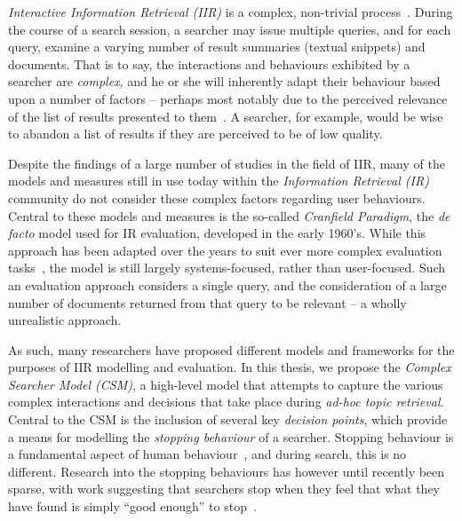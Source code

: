 
\begin{preamble}
{}

\emph{Interactive Information Retrieval (IIR)} is a complex, non-trivial process~\citep{ingwersen2005theturn}. During the course of a search session, a searcher may issue multiple queries, and for each query, examine a varying number of result summaries (textual snippets) and documents. That is to say, the interactions and behaviours exhibited by a searcher are \emph{complex}, and he or she will inherently adapt their behaviour based upon a number of factors -- perhaps most notably due to the perceived relevance of the list of results presented to them~\citep{moffat2013users_versus_models}. A searcher, for example, would be wise to abandon a list of results if they are perceived to be of low quality.

Despite the findings of a large number of studies in the field of IIR, many of the models and measures still in use today within the \emph{Information Retrieval (IR)} community do not consider these complex factors regarding user behaviours. Central to these models and measures is the so-called \emph{Cranfield Paradigm}, the \emph{de facto} model used for IR evaluation, developed in the early 1960's. While this approach has been adapted over the years to suit ever more complex evaluation tasks~\citep{harman2010cranfield}, the model is still largely systems-focused, rather than user-focused. Such an evaluation approach considers a single query, and the consideration of a large number of documents returned from that query to be relevant -- a wholly unrealistic approach.

As such, many researchers have proposed different models and frameworks for the purposes of IIR modelling and evaluation. In this thesis, we propose the \emph{Complex Searcher Model (CSM)}, a high-level model that attempts to capture the various complex interactions and decisions that take place during \emph{ad-hoc topic retrieval}. Central to the CSM is the inclusion of several key \emph{decision points}, which provide a means for modelling the \emph{stopping behaviour} of a searcher. Stopping behaviour is a fundamental aspect of human behaviour~\citep{nickles1995judgment}, and during search, this is no different. Research into the stopping behaviours has however until recently been sparse, with work suggesting that searchers stop when they feel that what they have found is simply ``good enough'' to stop~\citep{wu2014information_scent}.


\end{preamble}
